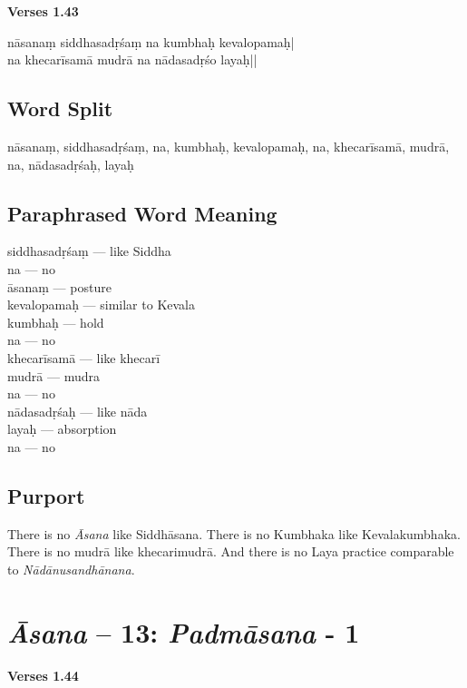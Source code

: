 \newpage
\noindent \textbf{Verses 1.43}

\begin{shloka}
nāsanaṃ siddhasadṛśaṃ na kumbhaḥ kevalopamaḥ|\\
na khecarīsamā mudrā na nādasadṛśo layaḥ||
\end{shloka}

\subsection*{Word Split}

nāsanaṃ, siddhasadṛśaṃ, na, kumbhaḥ, kevalopamaḥ, na, khecarīsamā, mudrā, na, nādasadṛśaḥ, layaḥ 

\subsection*{Paraphrased Word Meaning}

\begin{multicols}{2}
\itemsep=0pt
siddhasadṛśaṃ --- like Siddha \\
na --- no \\
āsanaṃ --- posture  \\
kevalopamaḥ --- similar to Kevala  \\
kumbhaḥ ---  hold  \\
na --- no \\
khecarīsamā --- like khecarī   \\
mudrā --- mudra \\
na ---  no	 \\		
nādasadṛśaḥ --- like nāda	 \\
layaḥ --- absorption  \\
na --- no
\end{multicols}

\subsection*{Purport}

There is no \textit{Āsana} like Siddhāsana. There is no Kumbhaka like Kevalakumbhaka. There is no mudrā like khecarimudrā. And there is no Laya practice comparable to \textit{Nādānusandhānana}.
\newpage

\section*{\textit{Āsana} -- 13: \textit{Padmāsana} - 1}

\noindent \textbf{Verses 1.44}

